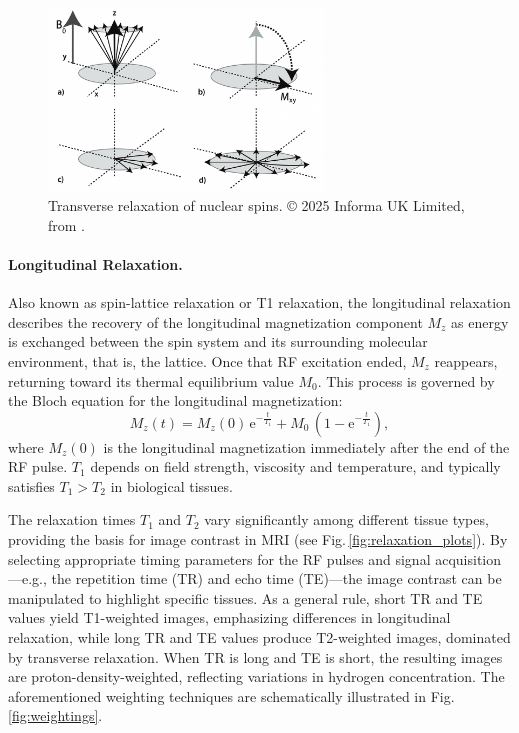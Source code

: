 \begin{figure}[htbp]
    \centering
    \includegraphics[width=0.65\textwidth]{figures/transverse_relaxation.png}
    \caption{Transverse relaxation of nuclear spins. © 2025 Informa UK Limited, from \cite{Lanting2010}.}
    \label{fig:transverse_relaxation}
\end{figure}

\paragraph{Longitudinal Relaxation.} Also known as spin-lattice relaxation or T1 relaxation, the longitudinal relaxation describes the recovery of the longitudinal magnetization component $M_z$ as energy is exchanged between the spin system and its surrounding molecular environment, that is, the lattice. Once that RF excitation ended, $M_z$ reappears, returning toward its thermal equilibrium value $M_0$. This process is governed by the Bloch equation for the longitudinal magnetization:
\begin{equation}
    M_z(t)=M_z(0)\,\mathrm{e}^{-\frac{t}{T_1}}+M_0\,\left(1-\mathrm{e}^{-\frac{t}{T_1}}\right),
\end{equation}
where $M_z(0)$ is the longitudinal magnetization immediately after the end of the RF pulse. $T_1$ depends on field strength, viscosity and temperature, and typically satisfies $T_1>T_2$ in biological tissues.

The relaxation times $T_1$ and $T_2$ vary significantly among different tissue types, providing the basis for image contrast in MRI (see Fig.\,\ref{fig:relaxation_plots}). By selecting appropriate timing parameters for the RF pulses and signal acquisition---e.g., the repetition time (TR) and echo time (TE)---the image contrast can be manipulated to highlight specific tissues. As a general rule, short TR and TE values yield T1-weighted images, emphasizing differences in longitudinal relaxation, while long TR and TE values produce T2-weighted images, dominated by transverse relaxation. When TR is long and TE is short, the resulting images are proton-density-weighted, reflecting variations in hydrogen concentration. The aforementioned weighting techniques are schematically illustrated in Fig.\,\ref{fig:weightings}.

